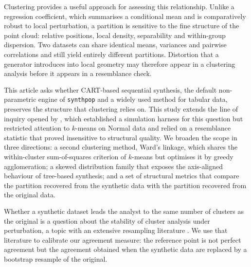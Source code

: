 \documentclass[pdflatex,referee]{sn-jnl}
\begin{document}
Clustering provides a useful approach for assessing this relationship. Unlike
a regression coefficient, which summarises a conditional mean and is
comparatively robust to local perturbation, a partition is sensitive to the
fine structure of the point cloud: relative positions, local density,
separability and within-group dispersion. Two datasets can share identical
means, variances and pairwise correlations and still yield entirely different
partitions. Distortion that a generator introduces into local geometry may
therefore appear in a clustering analysis before it appears in a resemblance
check.

This article asks whether CART-based sequential synthesis, the default
non-parametric engine of \texttt{synthpop} \citep{nowok2016} and a widely used
method for tabular data, preserves the structure that clustering relies on.
This study extends the line of inquiry opened by \citet{chen2025}, which
established a simulation harness for this question but restricted attention to
$k$-means on Normal data and relied on a resemblance statistic that proved
insensitive to structural quality. We broaden the scope in three directions: a
second clustering method, Ward's linkage, which shares the within-cluster
sum-of-squares criterion of $k$-means but optimises it by greedy agglomeration;
a skewed distribution family that exposes the axis-aligned behaviour of
tree-based synthesis; and a set of structural metrics that compare the
partition recovered from the synthetic data with the partition recovered from
the original data.

Whether a synthetic dataset leads the analyst to the same number of clusters
as the original is a question about the stability of cluster analysis under
perturbation, a topic with an extensive resampling literature
\citep{benhur2002,dudoit2002,tibshirani2005,hennig2007,luxburg2010}. We use
that literature to calibrate our agreement measure: the reference point is not
perfect agreement but the agreement obtained when the synthetic data are
replaced by a bootstrap resample of the original.
\end{document}
